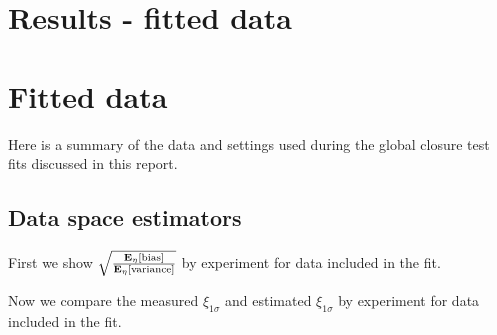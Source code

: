 \section{Results - fitted data}

\section{Fitted data}

Here is a summary of the data and settings used during the global closure test
fits discussed in this report.



\subsection{Data space estimators}

First we show $\sqrt{\frac{\mathbf{E}_{\eta}\left[ {\rm bias} \right]}{\mathbf{E}_{\eta}\left[ {\rm variance} \right]}}$ by experiment
for data included in the fit.



Now we compare the measured $\xi_{1\sigma}$ and estimated $\xi_{1\sigma}$ by experiment
for data included in the fit.

